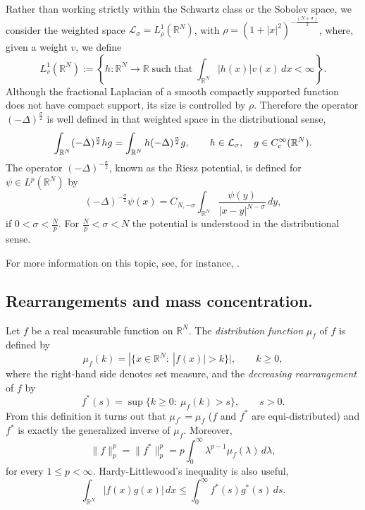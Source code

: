 \documentclass[leqno,12pt]{amsart}
\theoremstyle{definition}
\theoremstyle{remark}
\numberwithin{equation}{section}
\begin{document}
Rather than working strictly within the Schwartz class or the Sobolev space, we consider the weighted space 
$\mathcal{L}_{\sigma}=L^1_\rho(\mathbb{R}^N)$, with $\rho=(1+|x|^2)^{-\frac{(N+\sigma)}2}$, 
where, given a weight $v$, we define
$$
L^1_v(\mathbb{R}^N):=\left\{h:\mathbb{R}^N\rightarrow\mathbb{R} \;\text{such that}\;\int_{\mathbb{R}^N}|h(x)|v(x)\,dx<\infty\right\}.
$$ 
Although the fractional Laplacian of a smooth compactly supported function does not have compact support, its size is controlled by $\rho$. Therefore the operator $(-\Delta)^{\frac\sigma2}$ is well defined in that weighted space in the distributional sense, 
$$
\int_{\mathbb{R}^N}(-\Delta)^{\frac\sigma2}hg=\int_{\mathbb{R}^N}h(-\Delta)^{\frac\sigma2}g,\qquad h\in \mathcal{L}_{\sigma},\quad g\in C^\infty_{\textup{c}}(\mathbb{R}^N).
$$
The operator $(-\Delta)^{-\frac\sigma2}$, known as the Riesz potential, is defined for $\psi\in L^p(\mathbb{R}^N)$ by
\begin{equation}\label{riesz}
    (-\Delta)^{-\frac\sigma2}\psi(x)=C_{N,-\sigma}\int_{\mathbb{R}^N}\frac{\psi(y)}{|x-y|^{N-\sigma}}\,dy,
\end{equation}
if $0<\sigma<\frac Np$. For $\frac Np<\sigma<N$ the potential is understood in the distributional sense.

For more information on this topic, see, for instance, \cite{DiNezza-Palatucci-Valdinoci-2012,Landkof-1972,Stein-1970}.


\subsection*{Rearrangements and mass concentration.}

Let $f$ be a real measurable function on $\mathbb{R}^N$. The \emph{distribution function} $\mu_f$ of $f$ is defined by
\[ 
    \mu_f(k)=|\{x\in\mathbb{R}^N:\ |f(x)|>k\}|, \qquad k\ge 0,
\]
where the right-hand side denotes set measure, and the \emph{decreasing rearrangement} of $f$ by
\[
    f^*(s)=\sup\{k\ge 0:\ \mu_f(k)>s\}, \qquad s>0.
\]
From this definition it turns out that
$\mu_{f^*}=\mu_f$ ($f$ and $f^*$ are equi-distributed) and $f^*$ is exactly
the generalized inverse of $\mu_f$. Moreover,
$$
\|f\|_p^p=\|f^*\|_p^p=p\int_0^\infty\lambda^{p-1}\mu_f(\lambda)\,d\lambda,
$$
for every $1\le p<\infty$. Hardy-Littlewood's inequality is also useful,
\begin{equation}\label{H-L}
\int_{\mathbb{R}^N}|f(x)g(x)|\,dx\le \int_0^\infty f^*(s)g^*(s)\,ds.
\end{equation}
\end{document}

